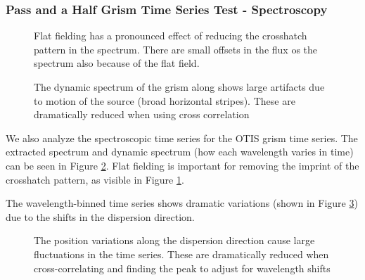 \documentclass{aastex62}
\begin{document}
\subsubsection{Pass and a Half Grism Time Series Test - Spectroscopy}

\begin{figure}
\caption{Flat fielding has a pronounced effect of reducing the crosshatch pattern in the spectrum.
There are small offsets in the flux os the spectrum also because of the flat field.
}\label{fig:otisLWflatVsNoFlat}
\end{figure}


\begin{figure}
\caption{The dynamic spectrum of the grism along shows large artifacts due to motion of the source (broad horizontal stripes).
These are dramatically reduced when using cross correlation
}\label{fig:otisLWdynSpec}
\end{figure}


We also analyze the spectroscopic time series for the OTIS grism time series.
The extracted spectrum and dynamic spectrum (how each wavelength varies in time) can be seen in Figure \ref{fig:otisLWdynSpec}.
Flat fielding is important for removing the imprint of the crosshatch pattern, as visible in Figure \ref{fig:otisLWflatVsNoFlat}.

The wavelength-binned time series shows dramatic variations (shown in Figure \ref{fig:otisWavebinTSeries}) due to the shifts in the dispersion direction.

\begin{figure}
\caption{The position variations along the dispersion direction cause large fluctuations in the time series.
These are dramatically reduced when cross-correlating and finding the peak to adjust for wavelength shifts
}\label{fig:otisWavebinTSeries}
\end{figure}
\end{document}
